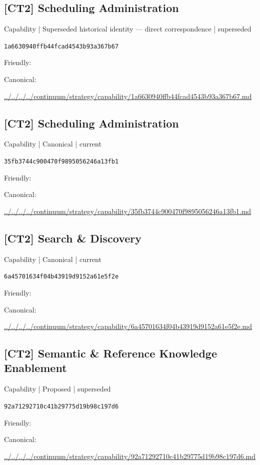 \documentclass[10pt,a4paper]{article}
\begin{document}
\subsection*{[CT2] Scheduling Administration}
{\small Capability | Superseded historical identity — direct correspondence | superseded}\par
\texttt{1a6630940ffb44fcad4543b93a367b67}\par
Friendly: \par
Canonical: \par
{\footnotesize\url{../../../../continuum/strategy/capability/1a6630940ffb44fcad4543b93a367b67.md}}\par
\subsection*{[CT2] Scheduling Administration}
{\small Capability | Canonical | current}\par
\texttt{35fb3744c900470f9895056246a13fb1}\par
Friendly: \par
Canonical: \par
{\footnotesize\url{../../../../continuum/strategy/capability/35fb3744c900470f9895056246a13fb1.md}}\par
\subsection*{[CT2] Search \& Discovery}
{\small Capability | Canonical | current}\par
\texttt{6a45701634f04b43919d9152a61e5f2e}\par
Friendly: \par
Canonical: \par
{\footnotesize\url{../../../../continuum/strategy/capability/6a45701634f04b43919d9152a61e5f2e.md}}\par
\subsection*{[CT2] Semantic \& Reference Knowledge Enablement}
{\small Capability | Proposed | superseded}\par
\texttt{92a71292710c41b29775d19b98c197d6}\par
Friendly: \par
Canonical: \par
{\footnotesize\url{../../../../continuum/strategy/capability/92a71292710c41b29775d19b98c197d6.md}}\par
\end{document}

